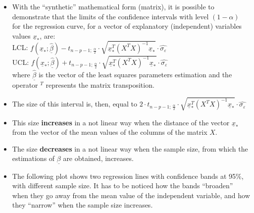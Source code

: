\begin{frame}
  \vspace*{.25cm}
  \begin{itemize}
    \item With the ``synthetic'' mathematical form (matrix), it is possible to demonstrate that the limits of the confidence intervals with level $(1-\alpha)$ for the regression curve, for a vector of explanatory (independent) variables values $\underline{x}_*$, are: \\
      \vspace*{.1cm}
      LCL: $f(\underline{x}_*;\hat{\underline{\beta}})-t_{n-p-1;\,\frac{\alpha}{2}}\cdot \sqrt{\underline{x}_*^T(X^TX)^{-1}\underline{x}_*}\cdot \hat{\sigma_\varepsilon}$ \\
      \vspace*{.1cm}
      UCL: $f(\underline{x}_*;\hat{\underline{\beta}})+t_{n-p-1;\,\frac{\alpha}{2}}\cdot \sqrt{\underline{x}_*^T(X^TX)^{-1}\underline{x}_*}\cdot \hat{\sigma_\varepsilon}$ \\
      \vspace*{.1cm}
      where $\hat{\underline{\beta}}$ is the vector of the least squares parameters estimation and the operator $^T$ represents the matrix transposition.
    \vspace{0.5cm}
    \item The size of this interval is, then, equal to $2\cdot t_{n-p-1;\,\frac{\alpha}{2}}\cdot \sqrt{\underline{x}_*^T(X^TX)^{-1}\underline{x}_*}\cdot \hat{\sigma_\varepsilon}$
  \end{itemize}
\end{frame}

\begin{frame}
  \vspace*{.25cm}
  \begin{itemize}
    \item This size \textbf{increases} in a not linear way when the distance of the vector $\underline{x}_*$ from the vector of the mean values of the columns of the matrix $X$.
    \vspace*{.25cm}
    \item The size \textbf{decreases} in a not linear way when the sample size, from which the estimations of $\underline{\beta}$ are obtained, increases.
    \vspace*{.25cm}
    \item The following plot shows two regression lines with confidence bands at 95\%, with different sample size. It has to be noticed how the bands ``broaden'' when they go away from the mean value of the independent variable, and how they ``narrow'' when the sample size increases.
  \end{itemize}
\end{frame}

